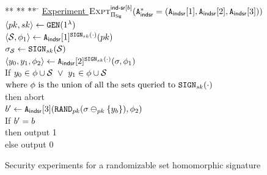 \begin{figure}
{\begin{minipage}[t]{0.48\textwidth}
    \end{minipage}%
    \hfill
    \begin{minipage}[t]{0.48\textwidth}
      \begin{tabbing}
			** \= ** \= ** \=\kill
			\underline{Experiment $\Experiment{\indsrLabel[\indBit]}{\sigScheme}(\indsrAdversaryCombDefn)$} \\
			\> $\langle \pubKey, \privKey \rangle \gets \keyGen(1^{\secParam})$ \\
			\> $\tupleDefn{\genericSetVar, \adversaryState{1}} \gets 
			\indsrAdversary{1}^{\signingAlg[\privKey](\cdot)}(\pubKey)$  \\
			\> $\genericSig[\genericSetVar]  \gets \signingAlg[\privKey](\genericSetVar)$ \\
			\> $\tupleDefn{\genericCInputElmt{0}, \genericCInputElmt{1}, 
			\adversaryState{2} } 
			\gets  
			\indsrAdversary{2}^{\signingAlg[\privKey](\cdot)}(\genericSig, \adversaryState{1})$  \\
			\> If $\genericCInputElmt{0} \in \queriedSets \cup \genericSetVar ~\lor~
			\genericCInputElmt{1} \in \queriedSets \cup \genericSetVar$\\
			\> \> $\mbox{where $\queriedSets$ is the 
				union of all the sets queried to $\signingAlg[\privKey](\cdot)$ }$ \\
			\> \> \> then abort \\
			\> $\advBit \gets 
			\indsrAdversary{3}(\randomize[\pubKey](\genericSig \sigMinus[\pubKey] 
			\{\genericCInputElmt{\indBit}\}), \adversaryState{2})$ \\
			
			\> If $b' = b$ \\
			\> \> then output 1 \\
			\> \> else output 0
		\end{tabbing}

    \end{minipage}%
}
\caption{Security experiments for a randomizable set homomorphic signature\label{fig:experiments}}
\end{figure}
